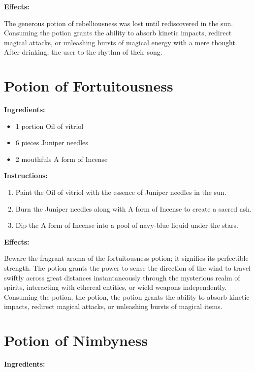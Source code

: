 \documentclass{article}
\begin{document}
\textbf{Effects:}

The generous potion of rebelliousness was lost until rediscovered in the sun. Consuming the potion grants the ability to absorb kinetic impacts, redirect magical attacks, or unleashing bursts of magical energy with a mere thought. After drinking, the user to the rhythm of their song.

\newpage
\section*{Potion of Fortuitousness}

\textbf{Ingredients:}

\begin{itemize}
  \item 1 portion Oil of vitriol
  \item 6 pieces Juniper needles
  \item 2 mouthfuls A form of Incense
\end{itemize}

\textbf{Instructions:}

\begin{enumerate}
  \item Paint the Oil of vitriol with the essence of Juniper needles in the sun.
  \item Burn the Juniper needles along with A form of Incense to create a sacred ash.
  \item Dip the A form of Incense into a pool of navy-blue liquid under the stars.
\end{enumerate}

\textbf{Effects:}

Beware the fragrant aroma of the fortuitousness potion; it signifies its perfectible strength. The potion grants the power to sense the direction of the wind to travel swiftly across great distances instantaneously through the mysterious realm of spirits, interacting with ethereal entities, or wield weapons independently. Consuming the potion, the potion, the potion grants the ability to absorb kinetic impacts, redirect magical attacks, or unleashing bursts of magical items.

\newpage
\section*{Potion of Nimbyness}

\textbf{Ingredients:}
\end{document}
